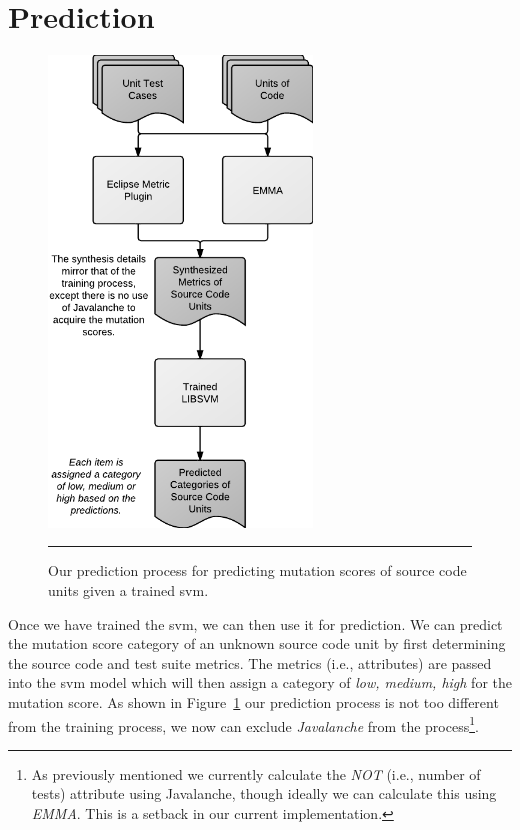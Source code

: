 \section{Prediction}
\label{sec:approach_prediction}
\begin{figure}[ht!]
  \centering
  \includegraphics[width=7cm]{figures/process_prediction.pdf}
  \caption{Our prediction process for predicting mutation scores of source code units given a trained \gls{svm}.}
  \label{fig:process_prediction}
  \vspace{2mm}
  \hrule
\end{figure}

Once we have trained the \gls{svm}, we can then use it for prediction. We can predict the mutation score category of an unknown source code unit by first determining the source code and test suite metrics. The metrics (i.e., attributes) are passed into the \gls{svm} model which will then assign a category of \textit{low, medium, high} for the mutation score. As shown in Figure~\ref{fig:process_prediction} our prediction process is not too different from the training process, we now can exclude \emph{Javalanche} from the process\footnote{As previously mentioned we currently calculate the \emph{NOT} (i.e., number of tests) attribute using Javalanche, though ideally we can calculate this using \emph{EMMA}. This is a setback in our current implementation.}.


